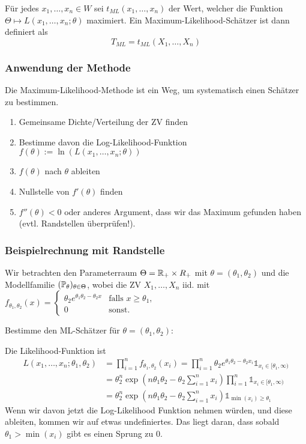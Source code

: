 \noindent Für jedes \(x_1, \ldots, x_n \in W\) sei \(t_{ML}(x_1, \ldots, x_n)\) der Wert, welcher die Funktion \(\Theta \mapsto L(x_1, \ldots, x_n; \theta)\) maximiert. Ein Maximum-Likelihood-Schätzer ist dann definiert als
\[T_{ML} = t_{ML}(X_1, \ldots, X_n)\]

\subsubsection{Anwendung der Methode}
Die Maximum-Likelihood-Methode ist ein Weg, um systematisch einen Schätzer zu bestimmen.
\begin{enumerate}
	\item Gemeinsame Dichte/Verteilung der ZV finden
	\item Bestimme davon die Log-Likelihood-Funktion\\ \(f(\theta) := \ln(L(x_1, \ldots, x_n;\theta))\)
	\item \(f(\theta)\) nach \(\theta\) ableiten
	\item Nullstelle von \(f'(\theta)\) finden
	\item $f''(\theta) < 0$ oder anderes Argument, dass wir das Maximum gefunden haben (evtl. Randstellen überprüfen!).
\end{enumerate}

\subsubsection*{Beispielrechnung mit Randstelle}
Wir betrachten den Parameterraum $\Theta = \R_+ \times R_+$ mit $\theta = (\theta_1, \theta_2)$ und die Modellfamilie $(\P_\theta)_{\theta\in \Theta}$, wobei die ZV $X_1, \ldots, X_n$ iid. mit $f_{\theta_1, \theta_2}(x) = \begin{cases}
    \theta_2e^{\theta_1\theta_2 - \theta_2x} & \text{falls }x \geq \theta_1,\\
    0 & \text{sonst.}
\end{cases}$

Bestimme den ML-Schätzer für $\theta = (\theta_1, \theta_2)$:

Die Likelihood-Funktion ist 
\begin{align*}
    L(x_1, \dots, x_n; \theta_1, \theta_2) &= \prod_{i = 1}^{n}f_{\theta_1, \theta_2}(x_i) = \prod_{i = 1}^n \theta_2e^{\theta_1\theta_2 - \theta_2 x_i} \mathds{1}_{x_i \in [\theta_1, \infty)}\\
    &= \theta_2^n \exp\left(n\theta_1\theta_2 - \theta_2 \sum_{i=1}^n x_i\right) \prod_{i=1}^n \mathds{1}_{x_i \in [\theta_1, \infty)}\\
    &= \theta_2^n \exp\left(n\theta_1\theta_2 - \theta_2 \sum_{i=1}^n x_i\right) \mathds{1}_{\min(x_i) \geq \theta_1}
\end{align*}
Wenn wir davon jetzt die Log-Likelihood Funktion nehmen würden, und diese ableiten, kommen wir auf etwas undefiniertes. 
Das liegt daran, dass sobald $\theta_1 > \min(x_i)$ gibt es einen Sprung zu $0$.

